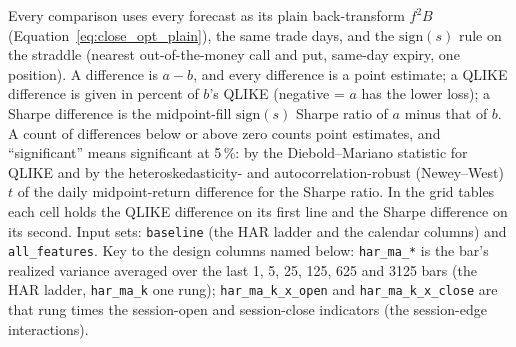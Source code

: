 Every comparison uses every forecast as its plain back-transform $f^{2}B$
(Equation~\eqref{eq:close_opt_plain}), the same
\campTradeDays{} trade days, and the $\mathrm{sign}(s)$ rule on the straddle (nearest
out-of-the-money call and put, same-day expiry, one position). A difference is $a-b$, and
every difference is a point estimate; a QLIKE difference is given in percent of $b$'s
QLIKE (negative = $a$ has the lower loss); a Sharpe difference is the midpoint-fill
$\mathrm{sign}(s)$ Sharpe ratio of $a$ minus that of $b$. A count of differences below or
above zero counts point estimates, and ``significant'' means significant at 5\,\%: by the
Diebold--Mariano statistic for QLIKE and by the heteroskedasticity- and
autocorrelation-robust (Newey--West) $t$ of the daily midpoint-return difference for the
Sharpe ratio. In the grid tables each cell holds the QLIKE difference on its first line
and the Sharpe difference on its second. Input sets: \texttt{baseline} (the HAR ladder and
the calendar columns) and \texttt{all\_features}. Key to the design columns named below:
\texttt{har\_ma\_*} is the bar's realized variance averaged over the last 1, 5, 25, 125,
625 and 3125 bars (the HAR ladder, \texttt{har\_ma\_k} one rung);
\texttt{har\_ma\_k\_x\_open} and \texttt{har\_ma\_k\_x\_close} are that rung times the
session-open and session-close indicators (the session-edge interactions).

